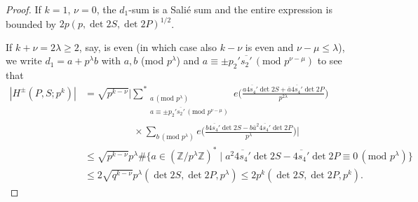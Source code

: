 \documentclass[11pt]{amsart}
\numberwithin{equation}{section}
\theoremstyle{plain}
\theoremstyle{definition}
\renewcommand{\geq}{\geqslant}
\renewcommand{\leq}{\le}
\numberwithin{equation}{section}
\begin{document}
\begin{proof}
If $k = 1$, $\nu = 0$, the $d_1$-sum is a Sali\'e sum and the entire expression is bounded by $2p(p, \det 2S, \det 2P)^{1/2}$.

  If $k+\nu =2\lambda \geq 2$, say, is even (in which case also $k - \nu$ is even  and $\nu - \mu \leq \lambda$), we write $d_1 = a + p^{\lambda} b$ with $a, b$ (mod $p^{\lambda}$) and $a  \equiv \pm p_2' \overline{s_2'} \, (\text{mod }p^{\nu - \mu})$ to see that %
  \begin{align}
|H^{\pm}(P, S;p^k)| &= \sqrt{p^ {k-\nu}} \Big| \underset{\substack{a \, (\text{mod } p^{\lambda}) \\  a \equiv \pm p_2' \overline{s_2'} \, (\text{mod }p^{\nu - \mu}) }}{\left.\sum\right.^{\ast}}  e \Big( \frac{ a  \overline{4s_4'}  \det 2S  + \bar{a}  \overline{4s_4'}  \det 2P }{ p^{2\lambda}} \Big)\\
& \quad\quad\quad\quad\quad  \times \sum_{b\, (\text{mod } p^{\lambda})}e \Big( \frac{ b  \overline{4s_4'} \det 2S  - b\bar{a}^2  \overline{ 4s_4'}  \det 2P }{ p^{ \lambda}} \Big)\Big|\\
 & \leq  \sqrt{p^ {k-\nu}}p^{\lambda} \#\{ a \in (\mathbb{Z}/p^{\lambda}\mathbb{Z})^{\ast} \mid a^2  \overline{4s_4'}  \det 2S  -   \overline{4s_4'}  \det 2P \equiv 0\, (\text{mod } p^{\lambda}) \} \\
 & \leq 2 \sqrt{q^ {k-\nu}} p^{\lambda} (\det 2S, \det 2P, p^{\lambda}) \leq 2p^k (\det 2S, \det 2P, p^k). %
\end{align}


\end{proof}
\end{document}
